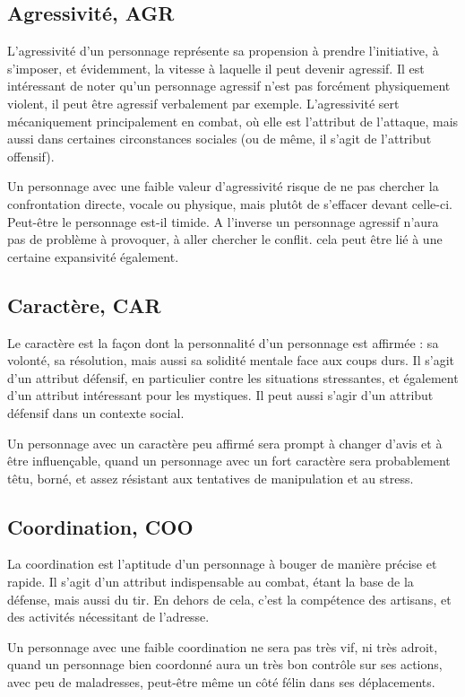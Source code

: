 \documentclass[10pt,a4paper,twocolumn]{book}
\begin{document}
\subsection{Agressivité, AGR}
L'agressivité d'un personnage représente sa propension à prendre l'initiative, à s'imposer, et évidemment, la vitesse à laquelle il peut devenir agressif. Il est intéressant de noter qu'un personnage agressif n'est pas forcément physiquement violent, il peut être agressif verbalement par exemple. L'agressivité sert mécaniquement principalement en combat, où elle est l'attribut de l'attaque, mais aussi dans certaines circonstances sociales (ou de même, il s'agit de l'attribut offensif).

Un personnage avec une faible valeur d'agressivité risque de ne pas chercher la confrontation directe, vocale ou physique, mais plutôt de s'effacer devant celle-ci. Peut-être le personnage est-il timide. A l'inverse un personnage agressif n'aura pas de problème à provoquer, à aller chercher le conflit. cela peut être lié à une certaine expansivité également.
\subsection{Caractère, CAR}
Le caractère est la façon dont la personnalité d'un personnage est affirmée : sa volonté, sa résolution, mais aussi sa solidité mentale face aux coups durs. Il s'agit d'un attribut défensif, en particulier contre les situations stressantes, et également d'un attribut intéressant pour les mystiques. Il peut aussi s'agir d'un attribut défensif dans un contexte social.

Un personnage avec un caractère peu affirmé sera prompt à changer d'avis et à être influençable, quand un personnage avec un fort caractère sera probablement têtu, borné, et assez résistant aux tentatives de manipulation et au stress.
\subsection{Coordination, COO}
La coordination est l'aptitude d'un personnage à bouger de manière précise et rapide. Il s'agit d'un attribut indispensable au combat, étant la base de la défense, mais aussi du tir. En dehors de cela, c'est la compétence des artisans, et des activités nécessitant de l'adresse.

Un personnage avec une faible coordination ne sera pas très vif, ni très adroit, quand un personnage bien coordonné aura un très bon contrôle sur ses actions, avec peu de maladresses, peut-être même un côté félin dans ses déplacements.
\end{document}
